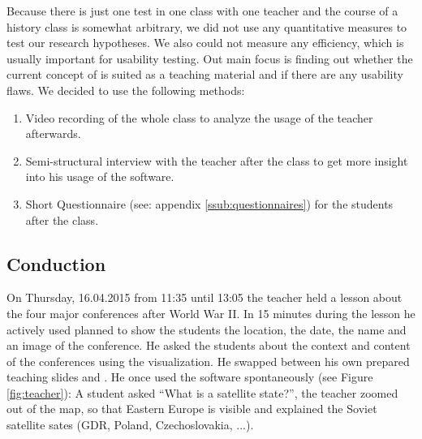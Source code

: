 Because there is just one test in one class with one teacher and the course of a history class is somewhat arbitrary, we did not use any quantitative measures to test our research hypotheses. We also could not measure any efficiency, which is usually important for usability testing. Out main focus is finding out whether the current concept of \HG is suited as a teaching material and if there are any usability flaws. We decided to use the following methods:

\begin{enumerate}
  \item Video recording of the whole class to analyze the usage of the teacher afterwards.
  \item Semi-structural interview with the teacher after the class to get more insight into his usage of the software.
  \item Short Questionnaire (see: appendix \ref{ssub:questionnaires}) for the students after the class.
\end{enumerate}


\subsection{Conduction} %
\label{sub:conduction-1}
On Thursday, 16.04.2015 from 11:35 until 13:05 the teacher held a lesson about the four major conferences after World War II. In 15 minutes during the lesson he actively used \HG planned to show the students the location, the date, the name and an image of the conference. He asked the students about the context and content of the conferences using the visualization. He swapped between his own prepared teaching slides and \HG. He once used the software spontaneously (see Figure \ref{fig:teacher}): A student asked ``What is a satellite state?'', the teacher zoomed out of the map, so that Eastern Europe is visible and explained the Soviet satellite sates (GDR, Poland, Czechoslovakia, ...).

